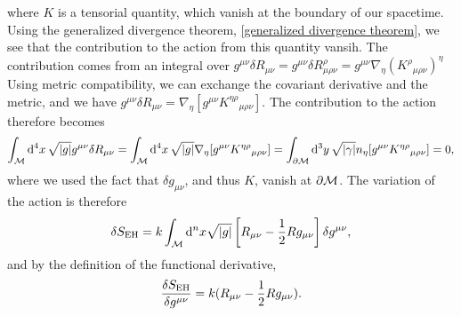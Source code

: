 %
where $K$ is a tensorial quantity, which vanish at the boundary of our spacetime.
Using the generalized divergence theorem, \autoref{generalized divergence theorem}, we see that the contribution to the action from this quantity vansih.
The contribution comes from an integral over $g^{\mu \nu} \delta R_{\mu \nu} = g^{\mu \nu} \delta R^{\rho}_{\mu \rho \nu} = g^{\mu \nu} \nabla_\eta (K^\rho{}_{\mu \rho \nu})^\eta$
Using metric compatibility, we can exchange the covariant derivative and the metric, and we have $g^{\mu \nu} \delta R_{\mu \nu} = \nabla_\eta [g^{\mu \nu}K^{\eta \rho}{}_{\mu \rho \nu}]$.
The contribution to the action therefore becomes
%
\begin{equation}
    \int_{\mathcal{M}} \dd^4 x \, \sqrt{|g|} g^{\mu \nu} \delta R_{\mu \nu} 
    = \int_{\mathcal{M}} \dd^4 x \, \sqrt{|g|} \nabla_\eta [g^{\mu \nu}K^{\eta \rho}{}_{\mu \rho \nu}]
    = \int_{\partial \mathcal{M}} \dd^3 y \, \sqrt{|\gamma|} n_\eta [g^{\mu \nu}K^{\eta \rho}{}_{\mu \rho \nu}] = 0,
\end{equation}
where we used the fact that $\delta g_{\mu \nu}$, and thus $K$, vanish at $\partial \mathcal{M}$.
The variation of the action is therefore
%
\begin{equation}
    \delta S_{\text{EH}} = k \int_{\mathcal{M}} \dd^n x \sqrt{|g|} \left[R_{\mu \nu} - \frac{1}{2} R g_{\mu \nu}\right] \delta g^{\mu \nu},
\end{equation}
%
and by the definition of the functional derivative, 
%
\begin{equation}
    \label{functional derivatie einstein-hilber action}
    \fdv{S_{\text{EH}}}{g^{\mu \nu}} 
    =
    k(R_{\mu \nu} - \frac{1}{2} R g_{\mu \nu}).
\end{equation}
